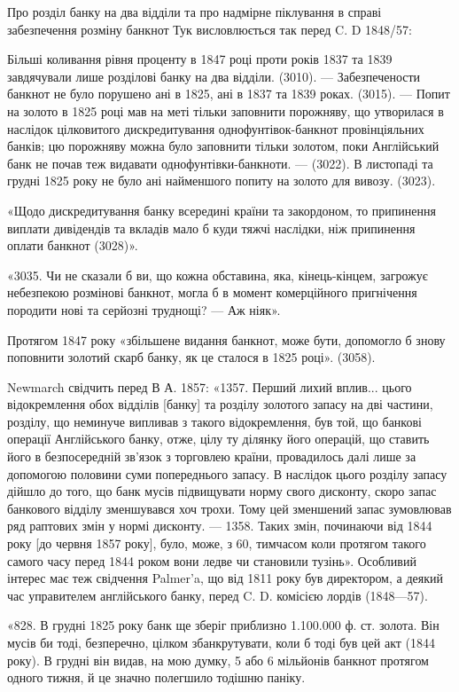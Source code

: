 Про розділ банку на два відділи та про надмірне піклування в справі забезпечення
розміну банкнот Тук висловлюється так перед C. D 1848/57:

Більші коливання рівня проценту в 1847 році проти років 1837 та 1839
завдячували лише розділові банку на два відділи. (3010). — Забезпечености банкнот
не було порушено ані в 1825, ані в 1837 та 1839 роках. (3015). — Попит
на золото в 1825 році мав на меті тільки заповнити порожняву, що утворилася
в наслідок цілковитого дискредитування однофунтівок-банкнот провінціяльних
банків; цю порожняву можна було заповнити тільки золотом, поки Англійський
банк не почав теж видавати однофунтівки-банкноти. — (3022). В листопаді та
грудні 1825 року не було ані найменшого попиту на золото для вивозу. (3023).

«Щодо дискредитування банку всередині країни та закордоном, то припинення
виплати дивідендів та вкладів мало б куди тяжчі наслідки, ніж припинення
оплати банкнот (3028)».

«3035. Чи не сказали б ви, що кожна обставина, яка, кінець-кінцем,
загрожує небезпекою розмінові банкнот, могла б в момент комерційного пригнічення
породити нові та серйозні труднощі? — Аж ніяк».

Протягом 1847 року «збільшене видання банкнот, може бути, допомогло б
знову поповнити золотий скарб банку, як це сталося в 1825 році». (3058).

Newmarch свідчить перед В А. 1857: «1357. Перший лихий вплив...
цього відокремлення обох відділів [банку] та розділу золотого запасу на дві частини,
розділу, що неминуче випливав з такого відокремлення, був той, що банкові
операції Англійського банку, отже, цілу ту ділянку його операцій, що ставить
його в безпосередній зв’язок з торговлею країни, провадилось далі лише за допомогою
половини суми попереднього запасу. В наслідок цього розділу запасу
дійшло до того, що банк мусів підвищувати норму свого дисконту, скоро запас
банкового відділу зменшувався хоч трохи. Тому цей зменшений запас зумовлював
ряд раптових змін у нормі дисконту. — 1358. Таких змін, починаючи від
1844 року [до червня 1857 року], було, може, з 60, тимчасом коли протягом
такого самого часу перед 1844 роком вони ледве чи становили тузінь». Особливий
інтерес має теж свідчення Palmer’a, що від 1811 року був директором, а
деякий час управителем англійського банку, перед C. D. комісією лордів (1848—57).

«828. В грудні 1825 року банк ще зберіг приблизно 1.100.000 ф. ст.
золота. Він мусів би тоді, безперечно, цілком збанкрутувати, коли б тоді був
цей акт (1844 року). В грудні він видав, на мою думку, 5 або 6 мільйонів
банкнот протягом одного тижня, й це значно полегшило тодішню паніку.

